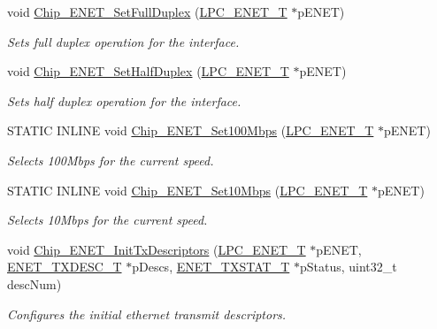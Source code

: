 \begin{DoxyCompactItemize}
void \hyperlink{group___e_n_e_t__17_x_x__40_x_x_ga0881ac9e0e98620c0e65f9a6d7a43240}{Chip\+\_\+\+E\+N\+E\+T\+\_\+\+Set\+Full\+Duplex} (\hyperlink{struct_l_p_c___e_n_e_t___t}{L\+P\+C\+\_\+\+E\+N\+E\+T\+\_\+\+T} $\ast$p\+E\+N\+E\+T)
\begin{DoxyCompactList}\small\item\em Sets full duplex operation for the interface. \end{DoxyCompactList}\item 
void \hyperlink{group___e_n_e_t__17_x_x__40_x_x_ga6d7031584471e30e89ded1fff5f3340d}{Chip\+\_\+\+E\+N\+E\+T\+\_\+\+Set\+Half\+Duplex} (\hyperlink{struct_l_p_c___e_n_e_t___t}{L\+P\+C\+\_\+\+E\+N\+E\+T\+\_\+\+T} $\ast$p\+E\+N\+E\+T)
\begin{DoxyCompactList}\small\item\em Sets half duplex operation for the interface. \end{DoxyCompactList}\item 
S\+T\+A\+T\+I\+C I\+N\+L\+I\+N\+E void \hyperlink{group___e_n_e_t__17_x_x__40_x_x_gad78db17fecab956142cb20d9a00e39e0}{Chip\+\_\+\+E\+N\+E\+T\+\_\+\+Set100\+Mbps} (\hyperlink{struct_l_p_c___e_n_e_t___t}{L\+P\+C\+\_\+\+E\+N\+E\+T\+\_\+\+T} $\ast$p\+E\+N\+E\+T)
\begin{DoxyCompactList}\small\item\em Selects 100\+Mbps for the current speed. \end{DoxyCompactList}\item 
S\+T\+A\+T\+I\+C I\+N\+L\+I\+N\+E void \hyperlink{group___e_n_e_t__17_x_x__40_x_x_ga996dae6b7276fc708594ce239f40785f}{Chip\+\_\+\+E\+N\+E\+T\+\_\+\+Set10\+Mbps} (\hyperlink{struct_l_p_c___e_n_e_t___t}{L\+P\+C\+\_\+\+E\+N\+E\+T\+\_\+\+T} $\ast$p\+E\+N\+E\+T)
\begin{DoxyCompactList}\small\item\em Selects 10\+Mbps for the current speed. \end{DoxyCompactList}\item 
void \hyperlink{group___e_n_e_t__17_x_x__40_x_x_ga1e57967b888b1a7bfd4313fd9e70c696}{Chip\+\_\+\+E\+N\+E\+T\+\_\+\+Init\+Tx\+Descriptors} (\hyperlink{struct_l_p_c___e_n_e_t___t}{L\+P\+C\+\_\+\+E\+N\+E\+T\+\_\+\+T} $\ast$p\+E\+N\+E\+T, \hyperlink{struct_e_n_e_t___t_x_d_e_s_c___t}{E\+N\+E\+T\+\_\+\+T\+X\+D\+E\+S\+C\+\_\+\+T} $\ast$p\+Descs, \hyperlink{struct_e_n_e_t___t_x_s_t_a_t___t}{E\+N\+E\+T\+\_\+\+T\+X\+S\+T\+A\+T\+\_\+\+T} $\ast$p\+Status, uint32\+\_\+t desc\+Num)
\begin{DoxyCompactList}\small\item\em Configures the initial ethernet transmit descriptors. \end{DoxyCompactList}\item 

\end{DoxyCompactItemize}
